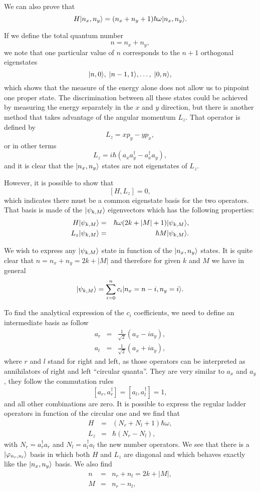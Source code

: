 We can also prove that
\[ H | n_x,n_y \rangle = (n_x + n_y +1) \hbar \omega | n_x,n_y \rangle.\]

If we define the total quantum number
\[ n = n_x + n_y, \]
we note that one particular value of $n$ corresponds to the $n+1$ orthogonal eigenstates
\[ | n,0 \rangle, \; | n-1,1 \rangle, \ldots, \; | 0,n \rangle, \]
which shows that the measure of the energy alone does not allow us to pinpoint one proper state. The discrimination between all these states could be achieved by measuring the energy separately in the $x$ and $y$ direction, but there is another method that takes advantage of the angular momentum $L_z$. That operator is defined by
\[ L_z = x p_y - y p_x,\]
or in other terms
\[ L_z= i\hbar(a_x a_y^\dagger-a_x^\dagger a_y), \]
and it is clear that the $| n_x,n_y \rangle$ states are not eigenstates of $L_z$.

However, it is possible to show that 
\[ [H,L_z]=0, \]
which indicates there must be a common eigenstate basis for the two operators. That basis is made of the $| \psi_{k,M} \rangle$ eigenvectors which has the following properties:
\begin{eqnarray}
H | \psi_{k,M} \rangle &=& \hbar \omega(2k+|M|+1) | \psi_{k,M} \rangle,\\
L_z | \psi_{k,M} \rangle &=& \hbar M | \psi_{k,M} \rangle.
\end{eqnarray}

We wish to express any $| \psi_{k,M} \rangle$ state in function of the $| n_x,n_y \rangle$ states. It is quite clear that $n=n_x+n_y=2k+|M|$ and therefore for given $k$ and $M$ we have in general
\[ | \psi_{k,M} \rangle = \sum_{i=0}^n c_i | n_x=n-i, n_y=i \rangle. \label{eq-2Dsum}\]

To find the analytical expression of the $c_i$ coefficients, we need to define an intermediate basis as follow
\begin{eqnarray}
a_r &=& \frac{1}{\sqrt 2} \left(a_x-ia_y \right), \\ 
a_l &=& \frac{1}{\sqrt 2} \left(a_x+ia_y \right),
\end{eqnarray}
where $r$ and $l$ stand for right and left, as those operators can be interpreted as annihilators of right and left  ``circular quanta''. They are very similar to $a_x$ and $a_y$, they follow the commutation rules
\[ [a_r,a^\dagger_r]= [a_l,a^\dagger_l]=1, \]
and all other combinations are zero. It is possible to express the regular ladder operators in function of the circular one and we find that
\begin{eqnarray}
H&=&(N_r + N_l +1) \hbar \omega,\\
L_z &=& \hbar (N_r- N_l) ,
\end{eqnarray}
with $N_r=a^\dagger_r a_r$ and $N_l=a^\dagger_l a_l$ the new number operators. We see that there is a $| \varphi_{n_r,n_l} \rangle$ basis in which both $H$ and $L_z$ are diagonal and which behaves exactly like the $| n_x,n_y \rangle$ basis. We also find
\begin{eqnarray}
n &=& n_r + n_l = 2k+ |M|, \\ 
M &=& n_r - n_l,
\end{eqnarray}

